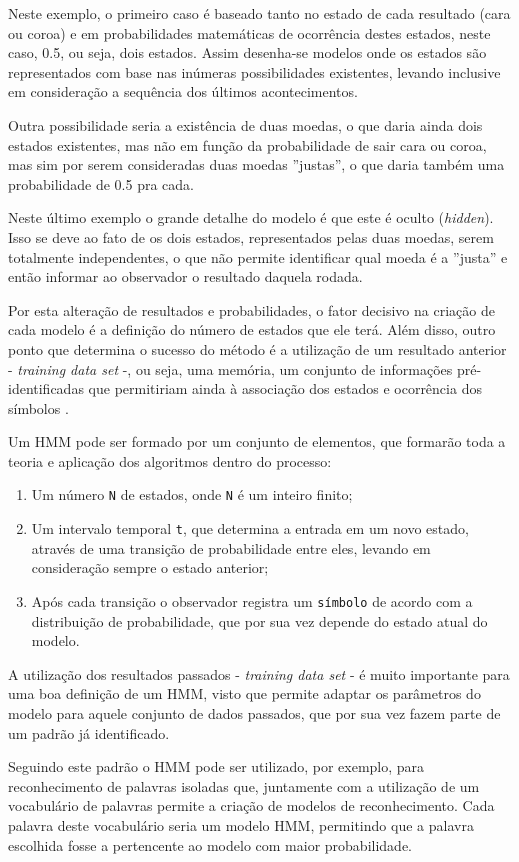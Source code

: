 Neste exemplo, o primeiro caso é baseado tanto no estado de cada resultado (cara ou coroa) e em probabilidades matemáticas de ocorrência destes estados, neste caso, 0.5, ou seja, dois estados. Assim desenha-se modelos onde os estados são representados com base nas inúmeras possibilidades existentes, levando inclusive em consideração a sequência dos últimos acontecimentos. \begin{textonovo}Outra possibilidade seria a existência de duas moedas, o que daria ainda dois estados existentes, mas não em função da probabilidade de sair cara ou coroa, mas sim por serem consideradas duas moedas ''justas'', o que daria também uma probabilidade de 0.5 pra cada.

Neste último exemplo o grande detalhe do modelo é que este é oculto (\textit{hidden}). Isso se deve ao fato de os dois estados, representados pelas duas moedas, serem totalmente independentes, o que não permite identificar qual moeda é a ''justa'' e então informar ao observador o resultado daquela rodada.

Por esta alteração de resultados e probabilidades, o fator decisivo na criação de cada modelo é a definição do número de estados que ele terá. Além disso, outro ponto que determina o sucesso do método é a utilização de um resultado anterior - \textit{training data set} -, ou seja, uma memória, um conjunto de informações pré-identificadas que permitiriam ainda à associação dos estados e ocorrência dos símbolos \cite{Rabiner-HMM}.

Um HMM pode ser formado por um conjunto de elementos, que formarão toda a teoria e aplicação dos algoritmos dentro do processo:

\begin{enumerate}
\item Um número \texttt{N} de estados, onde \texttt{N} é um inteiro finito;
\item Um intervalo temporal \texttt{t}, que determina a entrada em um novo estado, através de uma transição de probabilidade entre eles, levando em consideração sempre o estado anterior;
\item Após cada transição o observador registra um \texttt{símbolo} de acordo com a distribuição de probabilidade, que por sua vez depende do estado atual do modelo.
\end{enumerate}

A utilização dos resultados passados - \textit{training data set} - é muito importante para uma boa definição de um HMM, visto que permite adaptar os parâmetros do modelo para aquele conjunto de dados passados, que por sua vez fazem parte de um padrão já identificado.

Seguindo este padrão o HMM pode ser utilizado, por exemplo, para reconhecimento de palavras isoladas que, juntamente com a utilização de um vocabulário de palavras permite a criação de modelos de reconhecimento. Cada palavra deste vocabulário seria um modelo HMM, permitindo que a palavra escolhida fosse a pertencente ao modelo com maior probabilidade.

\end{textonovo}

